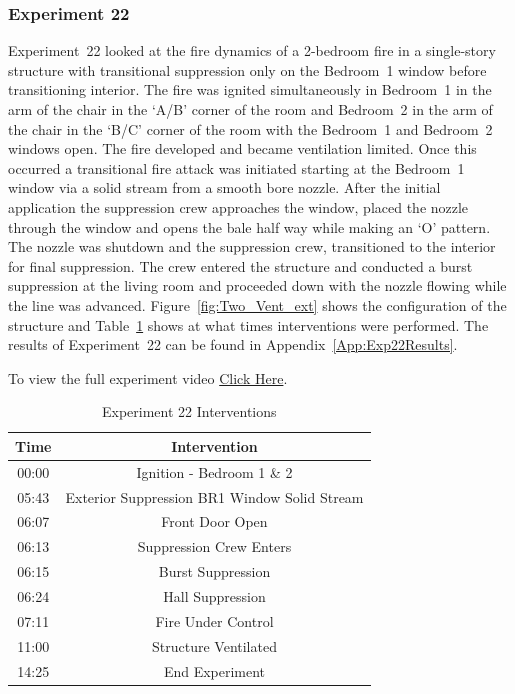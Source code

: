 \documentclass[12pt,oneside]{book}
\begin{document}
\FloatBarrier

\subsubsection{Experiment 22}
Experiment~22 looked at the fire dynamics of a 2-bedroom fire in a single-story structure with transitional suppression only on the Bedroom~1 window before transitioning interior. The fire was ignited simultaneously in Bedroom~1 in the arm of the chair in the `A/B' corner of the room and Bedroom~2 in the arm of the chair in the `B/C' corner of the room with the Bedroom~1 and Bedroom~2 windows open. The fire developed and became ventilation limited. Once this occurred a transitional fire attack was initiated starting at the Bedroom~1 window via a solid stream from a smooth bore nozzle. After the initial application the suppression crew approaches the window, placed the nozzle through the window and opens the bale half way while making an `O' pattern. The nozzle was shutdown and the suppression crew, transitioned to the interior for final suppression. The crew entered the structure and conducted a burst suppression at the living room and proceeded down with the nozzle flowing while the line was advanced. Figure~\ref{fig:Two_Vent_ext} shows the configuration of the structure and Table~\ref{Table:Exp22Interventions} shows at what times interventions were performed. The results of Experiment~22 can be found in Appendix~\ref{App:Exp22Results}. 

To view the full experiment video \href{https://player.vimeo.com/video/170499624?autoplay=1}{Click Here}.

\begin{table}[H]
	\centering
	\caption{Experiment 22 Interventions}
	\begin{tabular}{|c|c|} 
		\hline
		Time & Intervention \\ \hline \hline
		00:00 & Ignition - Bedroom 1 \& 2 \\ \hline
		05:43 & Exterior Suppression BR1 Window Solid Stream \\ \hline
		06:07 & Front Door Open \\ \hline
		06:13 & Suppression Crew Enters\\ \hline
		06:15 & Burst Suppression \\ \hline 
		06:24 & Hall Suppression \\ \hline
		07:11 & Fire Under Control \\ \hline
		11:00 & Structure Ventilated \\ \hline
		14:25 & End Experiment\\ \hline
	\end{tabular}
	\label{Table:Exp22Interventions}
\end{table}
\end{document}
